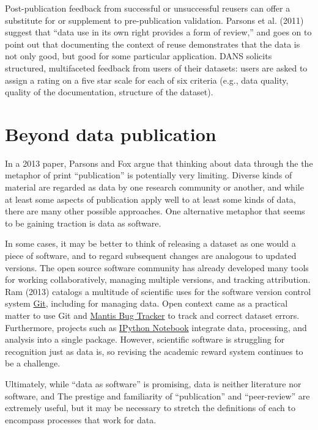 \documentclass[10pt,twocolumn]{article}
\begin{document}
Post-publication feedback from successful or unsuccessful reusers can offer a substitute for or supplement to pre-publication validation.
Parsons et al. (2011) suggest that ``data use in its own right provides a form of review,'' and goes on to point out that documenting the context of reuse demonstrates that the data is not only good, but good for some particular application.\cite{parsons_data_2011}
DANS solicits structured, multifaceted feedback from users of their datasets: users are asked to assign a rating on a five star scale for each of six criteria (e.g., data quality, quality of the documentation, structure of the dataset).\cite{grootveld_data_2011,grootveld_peer-reviewed_2012}



\section*{Beyond data publication}\label{beyond-data-publication}

In a 2013 paper\cite{parsons_is_2013}, Parsons and Fox argue that thinking about data through the the metaphor of print ``publication'' is potentially very limiting.
Diverse kinds of material are regarded as data by one research community or another, and while at least some aspects of publication apply well to at least some kinds of data, there are many other possible approaches.
One alternative metaphor that seems to be gaining traction is data as software.\cite{schopf_treating_2012}

In some cases, it may be better to think of releasing a dataset as one would a piece of software, and to regard subsequent changes are analogous to updated versions.
The open source software community has already developed many tools for working collaboratively, managing multiple versions, and tracking attribution.
Ram (2013)\cite{ram_git_2013} catalogs a multitude of scientific uses for the software version control system \href{http://git-scm.com/}{Git}, including for managing data.
Open context came as a practical matter to use Git and \href{http://www.mantisbt.org/}{Mantis Bug Tracker} to track and correct dataset errors.
Furthermore, projects such as \href{http://ipython.org/notebook}{IPython Notebook} integrate data, processing, and analysis into a single package.
However, scientific software is struggling for recognition\cite{pradal_publishing_2013} just as data is, so revising the academic reward system continues to be a challenge.

Ultimately, while ``data as software'' is promising, data is neither literature nor software, and
The prestige and familiarity of ``publication'' and ``peer-review'' are extremely useful, but it may be necessary to stretch the definitions of each to encompass processes that work for data.
\end{document}
